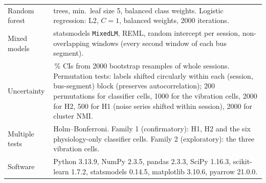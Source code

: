 \documentclass[runningheads]{llncs}
\begin{document}
\begin{table}[h]
\begin{tabular}{@{}>{\raggedright\arraybackslash}p{2.6cm}>{\raggedright\arraybackslash}p{9.1cm}@{}}
Random forest & 100 trees, min.\ leaf size 5, balanced class weights. Logistic regression: L2, $C=1$, balanced weights, 2000 iterations.\\
Mixed models & statsmodels \texttt{MixedLM}, REML, random intercept per session, non-overlapping windows (every second window of each bus segment).\\
Uncertainty & 95\,\% CIs from 2000 bootstrap resamples of whole sessions. Permutation tests: labels shifted circularly within each (session, bus-segment) block (preserves autocorrelation); 200 permutations for classifier cells, 1000 for the vibration cells, 2000 for H2, 500 for H1 (noise series shifted within session), 2000 for cluster NMI.\\
Multiple tests & Holm--Bonferroni. Family 1 (confirmatory): H1, H2 and the six physiology-only classifier cells. Family 2 (exploratory): the three vibration cells.\\
Software & Python 3.13.9, NumPy 2.3.5, pandas 2.3.3, SciPy 1.16.3, scikit-learn 1.7.2, statsmodels 0.14.5, matplotlib 3.10.6, pyarrow 21.0.0.\\
\bottomrule
\end{tabular}
\end{table}
\end{document}
